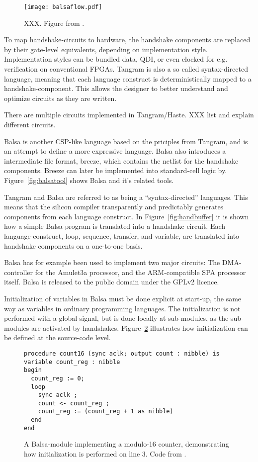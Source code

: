 \begin{figure}[htbp]
  \centering
  \texttt{[image: balsaflow.pdf]}
  \caption{XXX. Figure from \cite{tut}.}
  \label{fig:balsaflow}
\end{figure}


To map handshake-circuits to hardware, the handshake components are
replaced by their gate-level equivalents, depending on implementation
style. Implementation styles can be bundled data, QDI, or even clocked
for e.g. verification on conventional FPGAs. Tangram is also a so
called syntax-directed language, meaning that each language construct
is deterministically mapped to a handshake-component. This allows the
designer to better understand and optimize circuits as they are
written.

There are multiple circuits implemented in Tangram/Haste. XXX list and
explain different circuits.

Balsa\cite{tut} is another CSP-like language based on the priciples
from Tangram, and is an attempt to define a more expressive
language. Balsa also introduces a intermediate file format, breeze,
which contains the netlist for the handshake components. Breeze can
later be implemented into standard-cell logic
by. Figure~\ref{fig:balsatool} shows Balsa and it's related tools.

Tangram and Balsa are referred to as being a ``syntax-directed''
languages. This means that the silicon compiler transparently and
predictably generates components from each language construct. In
Figure~\ref{fig:handbuffer} it is shown how a simple Balsa-program is
translated into a handshake circuit. Each language-construct, loop,
sequence, transfer, and variable, are translated into handshake
components on a one-to-one basis.

Balsa has for example been used to implement two major circuits: The
DMA-controller for the Amulet3a processor, and the ARM-compatible SPA
processor itself. Balsa is released to the public domain under the
GPLv2 licence.

\label{par:init}
Initialization of variables in Balsa must be done explicit at
start-up, the same way as variables in ordinary programming
languages. The initialization is not performed with a global signal,
but is done locally at sub-modules, as the sub-modules are activated
by handshakes. Figure~\ref{fig:init} illustrates how initialization
can be defined at the source-code level.

\begin{figure}[htbp]
\begin{lstlisting}
procedure count16 (sync aclk; output count : nibble) is
variable count_reg : nibble
begin
  count_reg := 0;
  loop
    sync aclk ;
    count <- count_reg ;
    count_reg := (count_reg + 1 as nibble)
  end
end
\end{lstlisting}
\caption{A Balsa-module implementing a modulo-16 counter,
  demonstrating how initialization is performed on line 3. Code from
  \cite{tut}.}
\label{fig:init}
\end{figure}


